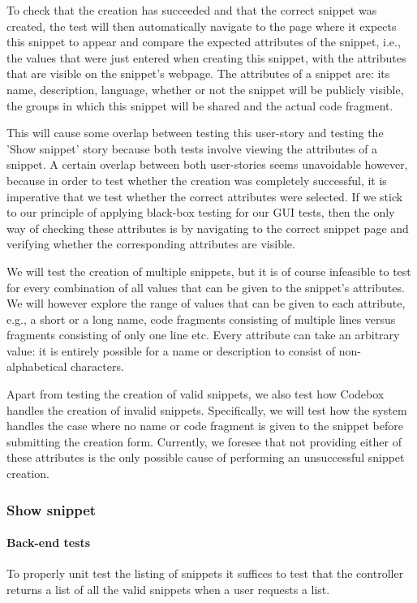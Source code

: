 \documentclass[10pt,a4paper,BCOR12mm, headexclude, footexclude,
  twoside, openright]{scrartcl}
\numberwithin{equation}{section} %
\numberwithin{figure}{section} %
\numberwithin{table}{section} %
\begin{document}
To check that the creation has succeeded and that the correct snippet was created, the test will then automatically navigate to the page where it expects this snippet to appear and compare the expected attributes of the snippet, i.e., the values that were just entered when creating this snippet, with the attributes that are visible on the snippet's webpage.
The attributes of a snippet are: its name, description, language, whether or not the snippet will be publicly visible, the groups in which this snippet will be shared and the actual code fragment.

This will cause some overlap between testing this user-story and testing the 'Show snippet' story because both tests involve viewing the attributes of a snippet.
A certain overlap between both user-stories seems unavoidable however, because in order to test whether the creation was completely successful, it is imperative that we test whether the correct attributes were selected.
If we stick to our principle of applying black-box testing for our GUI tests, then the only way of checking these attributes is by navigating to the correct snippet page and verifying whether the corresponding attributes are visible.

We will test the creation of multiple snippets, but it is of course infeasible to test for every combination of all values that can be given to the snippet's attributes.
We will however explore the range of values that can be given to each attribute, e.g., a short or a long name, code fragments consisting of multiple lines versus fragments consisting of only one line etc.
Every attribute can take an arbitrary value: it is entirely possible for a name or description to consist of non-alphabetical characters.

Apart from testing the creation of valid snippets, we also test how Codebox handles the creation of invalid snippets.
Specifically, we will test how the system handles the case where no name or code fragment is given to the snippet before submitting the creation form.
Currently, we foresee that not providing either of these attributes is the only possible cause of performing an unsuccessful snippet creation. 

\subsubsection*{Show snippet}
\paragraph{Back-end tests}
To properly unit test the listing of snippets it suffices to test that the controller returns a list of all the valid snippets when a user requests a list.
\end{document}
